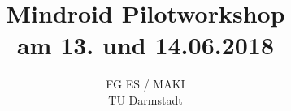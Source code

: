 	\author{}
	\title{Mindroid Pilotworkshop \\ am 13. und 14.06.2018}
	\subtitle{FG ES / MAKI \\ TU Darmstadt}
	\subsubtitle{}
	
	\maketitle	